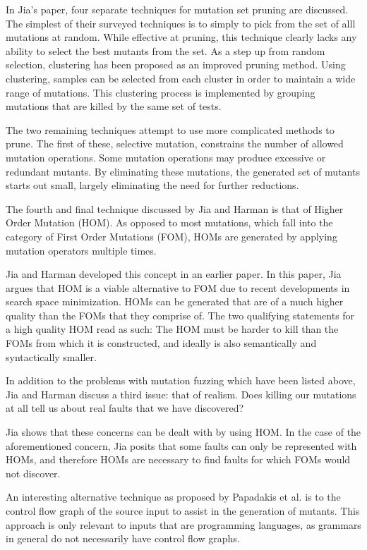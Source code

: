 In Jia's paper, four separate techniques for mutation set pruning are
discussed. The simplest of their surveyed techniques is to simply to
pick from the set of alll mutations at random. While effective at pruning, this
technique clearly lacks any ability to select the best mutants from
the set. As a step up from random selection, clustering has been
proposed as an improved pruning method. Using clustering, samples can
be selected from each cluster in order to maintain a wide range of
mutations. This clustering process is implemented by grouping
mutations that are killed by the same set of tests.

The two remaining techniques attempt to use more complicated methods
to prune. The first of these, selective mutation, constrains the
number of allowed mutation operations. Some mutation operations may produce excessive or
redundant mutants. By eliminating these mutations, the generated set
of mutants starts out small, largely eliminating the need for further
reductions.

The fourth and final technique discussed  by Jia and Harman is that of
Higher Order Mutation (HOM). As opposed to most mutations, which fall
into the category of First Order Mutations (FOM), HOMs are generated
by applying mutation operators multiple times.

Jia and Harman developed this concept in an earlier paper. \cite{Harman}
In this paper, Jia argues that HOM is a viable alternative to FOM due
to recent developments in search space minimization. HOMs can be
generated that are of a much higher quality than the FOMs that they
comprise of. The two qualifying statements for a high quality HOM read
as such: The HOM must be harder to kill than the FOMs from which it is
constructed, and ideally is also semantically and syntactically
smaller.

In addition to the problems with mutation fuzzing which have been
listed above, Jia and Harman discuss a third issue: that of
realism. Does killing our mutations at all tell us about real faults
that we have discovered?

Jia shows that these concerns can be dealt with by using HOM. In the
case of the aforementioned concern, Jia posits that some faults can
only be represented with HOMs, and therefore HOMs are necessary to
find faults for which FOMs would not discover.


An interesting alternative technique as proposed by Papadakis et
al. is to the control flow graph of the source input to assist in the
generation of mutants.\cite{Papadakis2010} This approach is only
relevant to inputs that are programming languages, as grammars in
general do not necessarily have control flow graphs.

